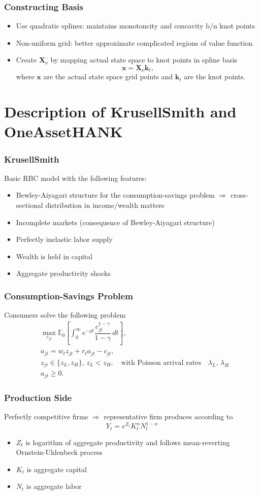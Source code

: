 \documentclass{beamer}
\newcommand{\bfk}{\mathbf{k}}
\newcommand{\bfx}{\mathbf{x}}
\newcommand{\bfX}{\mathbf{X}}
\newcommand{\E}{\mathbb{E}}
\newcommand{\RA}{\Rightarrow}
\begin{document}
\begin{frame}
  \frametitle{Constructing Basis}
  \begin{itemize}
  \item Use quadratic splines: maintains monotoncity and concavity b/n knot points
  \item Non-uniform grid: better approximate complicated regions of value function
  \item Create $\bfX_\nu$ by mapping actual state space to knot points in spline basis
    \[\bfx  = \bfX_\nu \bfk_t,\]
    where $\bfx$ are the actual state space grid points and $\bfk_t$ are the knot points.
 \end{itemize}
\end{frame}


\section{Description of KrusellSmith and OneAssetHANK}

\begin{frame}
  \frametitle{KrusellSmith}
  Basic RBC model with the following features:
  \begin{itemize}
  \item Bewley-Aiyagari structure for the consumption-savings problem $\RA$ cross-sectional distribution in income/wealth matters
  \item Incomplete markets (consequence of Bewley-Aiyagari structure)
  \item Perfectly inelastic labor supply
  \item Wealth is held in capital
  \item Aggregate productivity shocks
  \end{itemize}
\end{frame}
\begin{frame}
  \frametitle{Consumption-Savings Problem}
Consumers solve the following problem
\begin{align*}
&\max_{c_{jt}}\E_0\left[\int_0^\infty e^{-\rho t}\dfrac{c_{jt}^{1-\gamma}}{1-\gamma}\,dt\right],  \\
&\dot{a}_{jt} =  w_t z_{jt} + r_ta_{jt} -c_{jt},\\
&z_{jt}\in \{z_L, z_H\},\, z_L< z_H,\quad\text{with Poisson arrival rates}\quad \lambda_L, \, \lambda_H\\
& a_{jt}\geq 0.
\end{align*}
\end{frame}
\begin{frame}
  \frametitle{Production Side}
Perfectly competitive firms $\RA$ representative firm produces according to
\[Y_t = e^{Z_t}K_t^{\alpha}N_t^{1-\alpha} \]
\begin{itemize}
\item $Z_t$ is logarithm of aggregate productivity and follows mean-reverting Ornstein-Uhlenbeck process
\item $K_t$ is aggregate capital
\item $N_t$ is aggregate labor
\end{itemize}
\end{frame}
\end{document}
